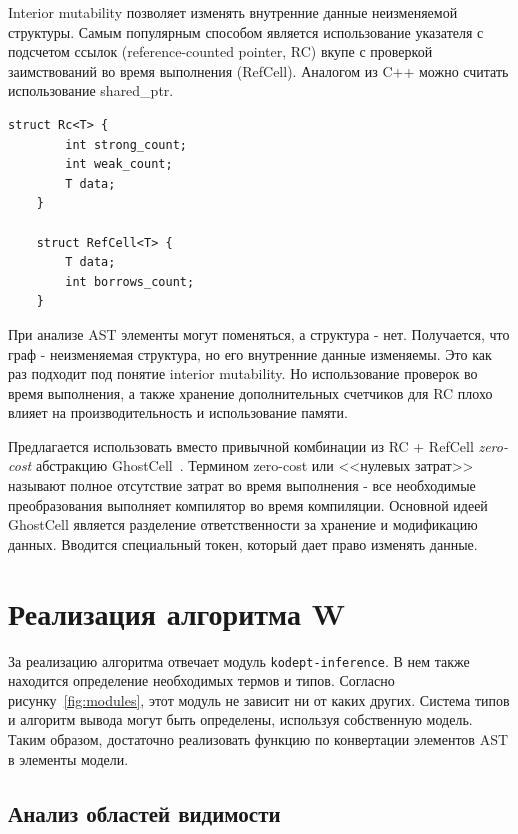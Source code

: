 Interior mutability позволяет изменять внутренние данные неизменяемой структуры.
Самым популярным способом является использование указателя с подсчетом ссылок (reference-counted pointer, RC) вкупе с проверкой заимствований во время выполнения (RefCell).
Аналогом из C++ можно считать использование shared\_ptr.

\begin{lstlisting}[label=lst:interior, caption={Упрощенная реализация структур Rc и RefCell на псевдокоде}]
    struct Rc<T> {
        int strong_count;
        int weak_count;
        T data;
    }

    struct RefCell<T> {
        T data;
        int borrows_count;
    }
\end{lstlisting}

При анализе AST элементы могут поменяться, а структура - нет.
Получается, что граф - неизменяемая структура, но его внутренние данные изменяемы.
Это как раз подходит под понятие interior mutability.
Но использование проверок во время выполнения, а также хранение дополнительных счетчиков для RC плохо влияет на производительность и использование памяти.

Предлагается использовать вместо привычной комбинации из RC + RefCell \textit{zero-cost} абстракцию GhostCell~\cite{GhostCell}.
Термином zero-cost или <<нулевых затрат>> называют полное отсутствие затрат во время выполнения - все необходимые преобразования выполняет компилятор во время компиляции.
Основной идеей GhostCell является разделение ответственности за хранение и модификацию данных.
Вводится специальный токен, который дает право изменять данные.

\section{Реализация алгоритма W}
\label{sec:algorithm_W}

За реализацию алгоритма отвечает модуль \lstinline{kodept-inference}.
В нем также находится определение необходимых термов и типов.
Согласно рисунку~\ref{fig:modules}, этот модуль не зависит ни от каких других.
Система типов и алгоритм вывода могут быть определены, используя собственную модель.
Таким образом, достаточно реализовать функцию по конвертации элементов AST в элементы модели.

\subsection{Анализ областей видимости}
\label{subsec:scope_analysis}

